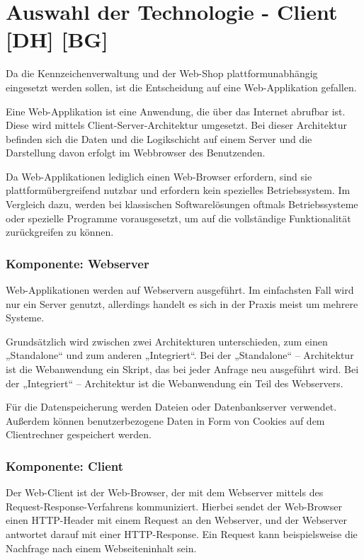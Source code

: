 \section{Auswahl der Technologie - Client [DH] [BG]}

Da die Kennzeichenverwaltung und der Web-Shop plattformunabhängig eingesetzt werden sollen, ist die Entscheidung auf eine Web-Applikation gefallen.

Eine Web-Applikation ist eine Anwendung, die über das Internet abrufbar ist. Diese wird mittels Client-Server-Architektur umgesetzt. Bei dieser Architektur befinden sich die Daten und die Logikschicht auf einem Server und die Darstellung davon erfolgt im Webbrowser des Benutzenden.

Da Web-Applikationen lediglich einen Web-Browser erfordern, sind sie plattformübergreifend nutzbar und erfordern kein spezielles Betriebssystem.
Im Vergleich dazu, werden bei klassischen Softwarelösungen oftmals Betriebssysteme oder spezielle Programme vorausgesetzt, um auf die vollständige Funktionalität zurückgreifen zu können.

\subsubsection{Komponente: Webserver}
Web-Applikationen werden auf Webservern ausgeführt. Im einfachsten Fall wird nur ein Server genutzt, allerdings handelt es sich in der Praxis meist um mehrere Systeme. 

Grundsätzlich wird zwischen zwei Architekturen unterschieden, zum einen „Standalone“ und zum anderen „Integriert“. Bei der „Standalone“ – Architektur ist die Webanwendung ein Skript, das bei jeder Anfrage neu ausgeführt wird. Bei der „Integriert“ – Architektur ist die Webanwendung ein Teil des Webservers.

Für die Datenspeicherung werden Dateien oder Datenbankserver verwendet. Außerdem können benutzerbezogene Daten in Form von Cookies auf dem Clientrechner gespeichert werden.

\subsubsection{Komponente: Client}

Der Web-Client ist der Web-Browser, der mit dem Webserver mittels des Request-Response-Verfahrens kommuniziert. Hierbei sendet der Web-Browser einen HTTP-Header mit einem Request an den Webserver, und der Webserver antwortet darauf mit einer HTTP-Response. Ein Request kann beispielsweise die Nachfrage nach einem Webseiteninhalt sein. 


